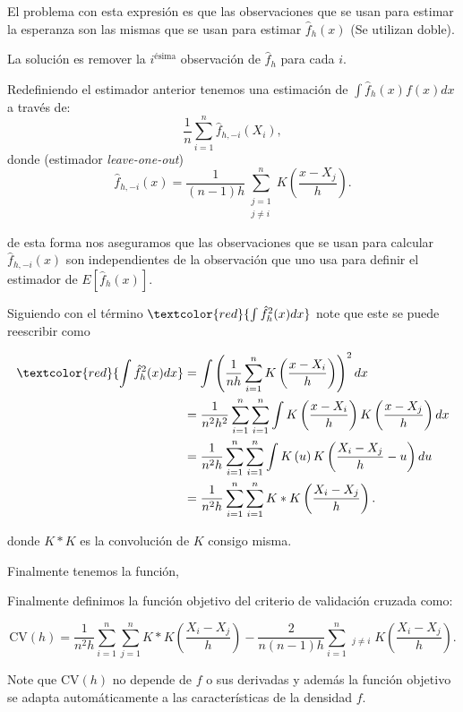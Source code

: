 \documentclass[
  12pt,
]{book}
\begin{document}
El problema con esta expresión es que las observaciones que se usan para
estimar la esperanza son las mismas que se usan para estimar
\(\hat{f}_{h}(x)\) (Se utilizan doble).

La solución es remover la \(i^{\text{ésima}}\) observación de
\(\hat{f}_{h}\) para cada \(i\).

Redefiniendo el estimador anterior tenemos una estimación de
\(\int \hat{f}_{h}(x)f(x)dx\) a través de: \[
\frac{1}{n}\sum_{i=1}^{n}\hat{f}_{h,-i}(X_{i}),
\] donde (estimador \emph{leave-one-out}) \[
\hat{f}_{h,-i}(x)=\frac{1}{(n-1)h}\sum_{\substack{j=1\\ j\neq i}}^{n}K\left( \frac{x-X_{j}}{h} \right) .
\]

de esta forma nos aseguramos que las observaciones que se usan para
calcular \(\hat{f}_{h,-i}(x)\) son independientes de la observación que
uno usa para definir el estimador de \(E[\hat f_h(x)]\).

Siguiendo con el término \(\textcolor{red}{\int\hat{f}_{h}^{2}(x)dx}\)
note que este se puede reescribir como

\begin{align*}
\textcolor{red}{\int\hat{f}_{h}^{2}(x)dx}
& =\int\left(\frac{1}{nh}\sum_{i=1}^{n}K\left( \frac{x-X_{i}}{h} \right)\right)^{2}dx                                    \\
& =\frac{1}{n^{2}h^{2}}\sum_{i=1}^{n}\sum_{i=1}^{n}\int K\left(\frac{x-X_{i}}{h}\right)K\left(\frac{x-X_{j}}{h}\right)dx \\
& =\frac{1}{n^{2}h}\sum_{i=1}^{n}\sum_{i=1}^{n}\int K\left(u\right)K\left(\frac{X_{i}-X_{j}}{h}-u\right)du               \\
& =\frac{1}{n^{2}h}\sum_{i=1}^{n}\sum_{i=1}^{n}K*K\left(\frac{X_{i}-X_{j}}{h}\right).
\end{align*}

donde \(K*K\) es la convolución de \(K\) consigo misma.

Finalmente tenemos la función,

Finalmente definimos la función objetivo del criterio de validación
cruzada como:

\[
\mathrm{CV}(h)=\frac{1}{n^{2}h}\sum_{i=1}^{n}\sum_{j=1}^{n}K*K\left(\frac{X_{i}-X_{j}}{h}\right)-\frac{2}{n(n-1)h}\sum_{i=1}^{n}\mathop{\sum_{j=1}^{n}}_{j\neq i}K\left( \frac{X_{i}-X_{j}}{h} \right).
\]

Note que \(\mathrm{CV}(h)\) no depende de \(f\) o sus derivadas y además
la función objetivo se adapta automáticamente a las características de
la densidad \(f\).
\end{document}
